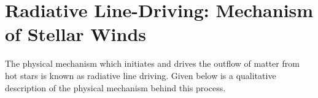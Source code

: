 	\section{Radiative Line-Driving: Mechanism of Stellar Winds} \label{tool:radiative-line-driving}
		The physical mechanism which initiates and drives the outflow of matter from hot stars is known as radiative line driving. Given below is a qualitative description of the physical mechanism behind this process.
		\begin{figure}[h!]
			\centering
			 \hfill

\end{figure}
